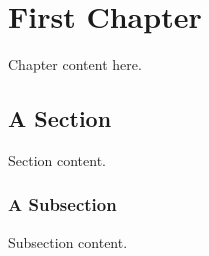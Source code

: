 \chapter{First Chapter}

Chapter content here.

\section{A Section}

Section content.

\subsection{A Subsection}

Subsection content.
